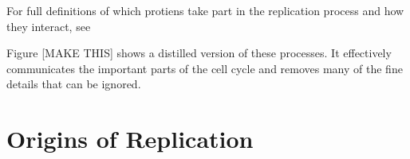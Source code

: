 \documentclass[serif]{sfuthesis}
\begin{document}
		For full definitions of which protiens take part in the replication process and how they interact, see \cite{PurifiedProteins}
		
	Figure [MAKE THIS] shows a distilled version of these processes. It effectively communicates the important parts of the cell cycle and removes many of the fine details that can be ignored.
	
	
	\section{Origins of Replication}
	
	
		

			
			
\end{document}
